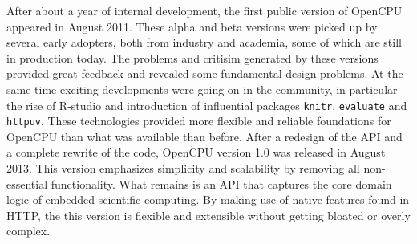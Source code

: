After about a year of internal development, the first public version of OpenCPU appeared in August 2011. These alpha and beta versions were picked up by several early adopters, both from industry and academia, some of which are still in production today. The problems and critisim generated by these versions provided great feedback and revealed some fundamental design problems. At the same time exciting developments were going on in the \R community, in particular the rise of R-studio and introduction of influential \R packages \texttt{knitr}, \texttt{evaluate} and \texttt{httpuv}. These technologies provided more flexible and reliable foundations for OpenCPU than what was available than before. After a redesign of the API and a complete rewrite of the code, OpenCPU version  1.0 was released in August 2013. This version emphasizes simplicity and scalability by removing all non-essential functionality. What remains is an API that captures the core domain logic of embedded scientific computing. By making use of native features found in HTTP, the this version is flexible and extensible without getting bloated or overly complex.

